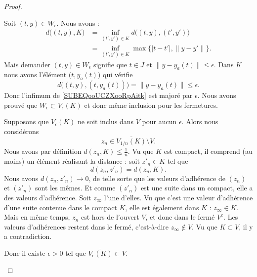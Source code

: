 \begin{proof}
\begin{subproof}
		Soit \( (t,y)\in W_{\epsilon}\). Nous avons :
		\begin{subequations}
			\begin{align}
				d\big( (t,y),K \big) & =\inf_{(t',y')\in K}d\big( (t,y),(t',y') \big)                                     \\
				                     & =\inf_{(t',y')\in K}\max\{ | t-t' |,\| y-y' \| \}.     \label{SUBEQooUCZXooRpAitk}
			\end{align}
		\end{subequations}
		Mais demander \( (t,y)\in W_{\epsilon}\) signifie que \( t\in J\) et \( \| y-y_a(t) \|\leq \epsilon\). Dans \( K \) nous avons l'élément \( \big( t,y_a(t) \big)\) qui vérifie
		\begin{equation}
			d\big( (t,y),(t,y_a(t)) \big)=\| y-y_a(t) \|\leq \epsilon.
		\end{equation}
		Donc l'infimum de \eqref{SUBEQooUCZXooRpAitk} est majoré par \( \epsilon\). Nous avons prouvé que \( W_{\epsilon}\subset V_{\epsilon}(K)\) et donc même inclusion pour les fermetures.


		Supposons que \( \overline{ V_{\epsilon}(K) }\) ne soit inclus dans \( V\) pour aucun \( \epsilon\). Alors nous considérons
		\begin{equation}
			z_n\in \overline{ V_{1/n}(K) }\setminus V.
		\end{equation}
		Nous avons par définition \( d(z_n,K)\leq \frac{1}{ n }\). Vu que \( K\) est compact, il comprend (au moins) un élément réalisant la distance : soit \( z'_n\in K\) tel que
		\begin{equation}
			d(z_n,z'_n)=d(z_n,K).
		\end{equation}
		Nous avons \( d(z_n,z'_n)\to 0\), de telle sorte que les valeurs d'adhérence de \( (z_n)\) et \( (z'_n)\) sont les mêmes. Et comme \( (z'_n)\) est une suite dans un compact, elle a des valeurs d'adhérence. Soit \( z_{\infty}\) l'une d'elles. Vu que c'est une valeur d'adhérence d'une suite contenue dans le compact \( K\), elle est également dans \( K\) : \( z_{\infty}\in K\). Mais en même temps, \( z_n\) est hors de l'ouvert \( V\), et donc dans le fermé \( V^c\). Les valeurs d'adhérences restent dans le fermé, c'est-à-dire \( z_{\infty}\notin V\). Vu que \( K\subset V\), il y a contradiction.

		Donc il existe \( \epsilon>0\) tel que \( \overline{ V_{\epsilon}(K) }\subset V\).


\end{subproof}
\end{proof}
